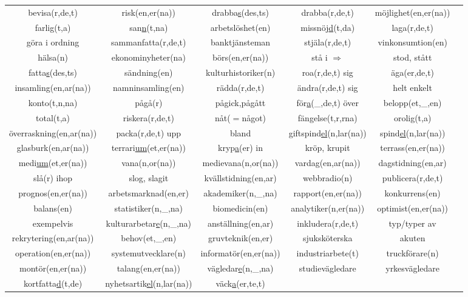 \begin{center}
\begin{adjustwidth}{-2.6cm}{}
\begin{tabular}{|c c c c c c|}
            bevisa(r,de,t) & risk(en,er(na)) & drabba\underline{s}(des,ts) & drabba(r,de,t) & möjlighet(en,er(na)) &  \\
            farlig(t,a) & san\underline{n}(t,na) & arbetslöshet(en) & missnöj\underline{d}(t,da) & laga(r,de,t) &  \\
            göra i ordning & sammanfatta(r,de,t) & banktjänsteman & stjäla(r,de,t) & vinkonsumtion(en) &  \\
            hälsa(n) & ekonominyheter(na) & börs(en,er(na)) & stå i $\Rightarrow$ & stod, stått &  \\
            fatta\underline{s}(des,ts) & sändning(en) & kulturhistoriker(n) & roa(r,de,t) sig & äga(er,de,t) &  \\
            insamling(en,ar(na)) & namninsamling(en) & rädda(r,de,t) & ändra(r,de,t) sig & helt enkelt &  \\
            konto(t,n,na) & pågå(r) & pågick,pågått & för\underline{a}(\_,de,t) över & belopp(et,\_,en) &  \\
            total(t,a) & riskera(r,de,t) & nåt($=$något) & fängelse(t,r,rna) & orolig(t,a) &  \\
            överraskning(en,ar(na)) & packa(r,de,t) upp & bland & giftspind\underline{el}(n,lar(na)) & spind\underline{el}(n,lar(na)) &  \\
            glasburk(en,ar(na)) & terrari\underline{um}(et,er(na)) & kryp\underline{a}(er) in & kröp, krupit & terrass(en,er(na)) &  \\
            medi\underline{um}(et,er(na)) & vana(n,or(na)) & medievana(n,or(na)) & vardag(en,ar(na)) & dagstidning(en,ar) &  \\
            slå(r) ihop & slog, slagit & kvällstidning(en,ar) & webbradio(n) & publicera(r,de,t) &  \\
            prognos(en,er(na)) & arbetsmarknad(en,er) & akademiker(n,\_,na) & rapport(en,er(na)) & konkurrens(en) &  \\
            balans(en) & statistiker(n,\_,na) & biomedicin(en) & analytiker(n,er(na)) & optimist(en,er(na)) &  \\
            exempelvis & kulturarbetar\underline{e}(n,\_,na) & anställning(en,ar) & inkludera(r,de,t) & typ/typer av &  \\
            rekrytering(en,ar(na)) & behov(et,\_,en) & gruvteknik(en,er) & sjuksköterska & akuten &  \\
            operation(en,er(na)) & systemutvecklare(n) & informatör(en,er(na)) & industriarbete(t) & truckförare(n) &  \\
            montör(en,er(na)) & talang(en,er(na)) & vägledar\underline{e}(n,\_,na) & studievägledare & yrkesvägledare &  \\
            kortfatta\underline{d}(t,de) & nyhetsartik\underline{el}(n,lar(na)) & väck\underline{a}(er,te,t) &  &  &  \\
            \hline
        \end{tabular}
    \end{adjustwidth}
\end{center}

